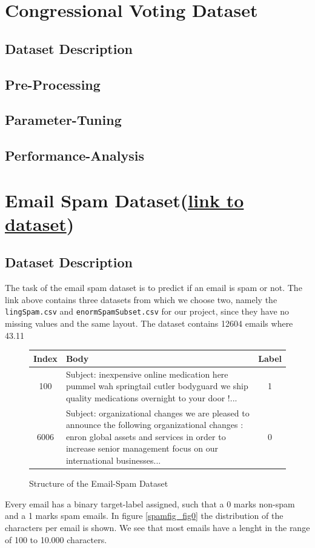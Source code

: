 \documentclass[11pt]{article}
\begin{document}
\section{Congressional Voting Dataset}
\subsection{Dataset Description}
\subsection{Pre-Processing}
\subsection{Parameter-Tuning}
\subsection{Performance-Analysis}


\section{Email Spam Dataset(\href{https://www.kaggle.com/nitishabharathi/email-spam-dataset}{link to dataset})}


\subsection{Dataset Description}
The task of the email spam dataset is to predict if an email is spam or not. The link above contains three datasets from which we choose two, namely the \texttt{lingSpam.csv} and \texttt{enormSpamSubset.csv} for our project, since they have no missing values and the same layout. The dataset contains 12604 emails where 43.11%

\begin{figure}[h]
  \begin{tabular}{ | c | p{15cm} | c |}
    \hline
    Index & Body & Label \\
    \hline
    100 & 
    Subject: inexpensive online medication here
 pummel wah springtail cutler bodyguard
 we ship quality medications overnight to your door !...
    & 1 \\ \hline
    6006
    &
    Subject: organizational changes
 we are pleased to announce the following organizational changes :
 enron global assets and services
 in order to increase senior management focus on our international businesses... 
    & 0 \\
    \hline
    \end{tabular}
    \caption{Structure of the Email-Spam Dataset}
    \label{tab_spam0}
  \end{figure}
Every email has a binary target-label assigned, such that a 0 marks non-spam and a 1 marks spam emails. In figure \ref{spamfig_fig0} the distribution of the characters per email is shown. We see that most emails have a lenght in the range of 100 to 10.000 characters.
\end{document}
